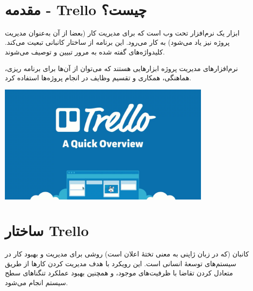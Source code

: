 \documentclass[]{article}
\begin{document}
\newpage
\pagestyle{fancy}
\fancyhf{}
\fancyfoot{}
\cfoot{\thepage}
\renewcommand{\headrulewidth}{2pt}

\KashidaOff


 \Large \textbf{\\
}


\section*{{\titr مقدمه - Trello چیست؟}}

ابزار  یک نرم‌افزار تحت وب است که برای مدیریت کار (بعضا از آن به‌عنوان مدیریت پروژه نیز یاد می‌شود) به کار می‌رود. این برنامه از ساختار کانبانی تبعیت می‌کند. کلید‌واژه‌های گفته شده به مرور تبیین و توصیف می‌شوند.

نرم‌افزارهای مدیریت پروژه ابزارهایی هستند که می‌توان از آن‌ها برای برنامه ریزی، هماهنگی، همکاری و تقسیم وظایف در انجام پروژه‌ها استفاده کرد.

\begin{center}

\includegraphics[width=0.8\textwidth]{images/image9.png}

\end{center}

\newpage

\section*{{\titr ساختار Trello}}

کانبان (که در زبان ژاپنی به معنی تختهٔ اعلان است) روشی برای مدیریت و بهبود کار در سیستم‌های توسعهٔ انسانی است. این رویکرد با هدف مدیریت کردن کارها از طریق متعادل کردن تقاضا با ظرفیت‌های موجود، و همچنین بهبود عملکرد تنگناهای سطح سیستم انجام می‌شود.
\end{document}
